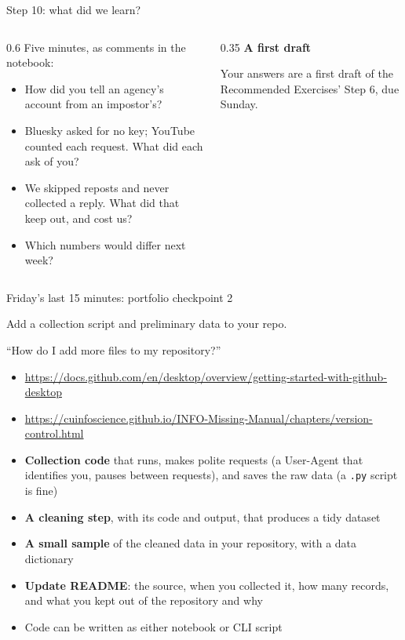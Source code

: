 \documentclass[9pt,aspectratio=169]{beamer}
\begin{document}
\begin{frame}{Step 10: what did we learn?}
    \begin{columns}[T]
        \begin{column}{0.6\textwidth}
            Five minutes, as comments in the notebook:
            \begin{itemize}\small
                \item How did you tell an agency's account from an impostor's?
                \item Bluesky asked for no key; YouTube counted each request. What did each ask of you?
                \item We skipped reposts and never collected a reply. What did that keep out, and cost us?
                \item Which numbers would differ next week?
            \end{itemize}
        \end{column}
        \begin{column}{0.35\textwidth}
            \textbf{A first draft}\\[2pt]
            {\footnotesize Your answers are a first draft of the Recommended Exercises' Step 6, due Sunday.\par}
        \end{column}
    \end{columns}
\end{frame}

\begin{frame}{Friday's last 15 minutes: portfolio checkpoint 2}

    Add a collection script and preliminary data to your repo.

    \medskip
    
    ``How do I add more files to my repository?'' 
    \begin{itemize}
        \item \url{https://docs.github.com/en/desktop/overview/getting-started-with-github-desktop}
        \item \url{https://cuinfoscience.github.io/INFO-Missing-Manual/chapters/version-control.html}
    \end{itemize}
    
    \begin{itemize}\small
        \item \textbf{Collection code} that runs, makes polite requests (a User-Agent that identifies you, pauses between requests), and saves the raw data (a \texttt{.py} script is fine)
        \item \textbf{A cleaning step}, with its code and output, that produces a tidy dataset
        \item \textbf{A small sample} of the cleaned data in your repository, with a data dictionary
        \item \textbf{Update README}: the source, when you collected it, how many records, and what you kept out of the repository and why
        \item Code can be written as either notebook or CLI script 
    \end{itemize}
\end{frame}
\end{document}
